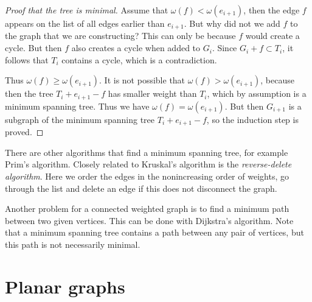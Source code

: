 \begin{page}
\begin{proof}[Proof that the tree is minimal]
Assume that $\omega(f) < \omega(e_{i+1})$, then the edge $f$ appears on the list of all edges earlier than $e_{i+1}$.
But why did not we add $f$ to the graph that we are constructing?
This can only be because $f$ would create a cycle.
But then $f$ also creates a cycle when added to $G_i$.
Since $G_i + f \subset T_i$, it follows that $T_i$ contains a cycle, which is a contradiction.

Thus $\omega(f) \ge \omega(e_{i+1})$.
It is not possible that $\omega(f) > \omega(e_{i+1})$, because then the tree $T_i + e_{i+1} - f$ has smaller weight than $T_i$,
which by assumption is a minimum spanning tree.
Thus we have $\omega(f) = \omega(e_{i+1})$.
But then $G_{i+1}$ is a subgraph of the minimum spanning tree $T_i + e_{i+1} - f$, so the induction step is proved.
\end{proof}



\end{page}

\begin{page}
\setcounter{section}{2}
\setcounter{subsection}{6}
\setcounter{dfn}{19}
\label{portion:311}

\begin{rem}
There are other algorithms that find a minimum spanning tree, for example Prim's algorithm.
Closely related to Kruskal's algorithm is the \emph{reverse-delete algorithm}.
Here we order the edges in the nonincreasing order of weights, go through the list
and delete an edge if this does not disconnect the graph.
\end{rem}

\end{page}

\begin{page}
\setcounter{section}{2}
\setcounter{subsection}{6}
\setcounter{dfn}{20}
\label{portion:314}

\begin{rem}
Another problem for a connected weighted graph is to find a minimum path between two given vertices.
This can be done with Dijkstra's algorithm.
Note that a minimum spanning tree contains a path between any pair of vertices, but this path is not necessarily minimal.
\end{rem}

\end{page}

\begin{page}
\setcounter{section}{3}
\setcounter{subsection}{1}
\setcounter{dfn}{0}
\label{portion:317}

\section{Planar graphs}

\end{page}

